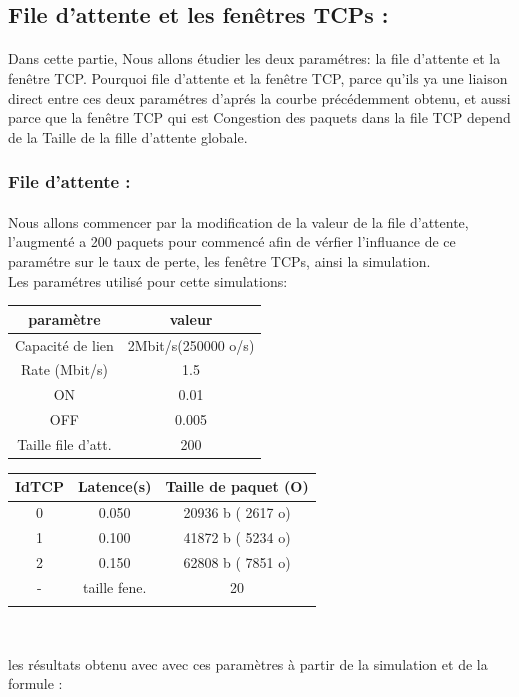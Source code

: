\documentclass[a4paper]{report}
\theoremstyle{definition}
\begin{document}
\newpage
\subsection*{File d'attente et les fenêtres TCPs :}
\paragraph{}
    Dans cette partie, Nous allons étudier les deux paramétres: la file d'attente et la fenêtre TCP.
	Pourquoi file d'attente et la fenêtre TCP, parce qu'ils ya une liaison direct entre ces deux paramétres d'aprés la courbe précédemment obtenu, et aussi parce que la fenêtre TCP qui est Congestion des paquets dans la file TCP depend de la Taille de la fille d'attente globale.
\subsubsection{File d'attente :}
\paragraph*{}
   Nous allons commencer par la modification de la valeur de la file d'attente, l'augmenté a 200 paquets pour commencé afin de vérfier l'influance de ce paramétre sur le taux de perte, les fenêtre TCPs, ainsi la simulation.\\
	Les paramétres utilisé pour cette simulations: \\
	\begin{center}
	

\begin{tabular}{|c|c|}
\hline
 paramètre  & valeur \\ \hline
 
 Capacité de lien & 2Mbit/s(250000 o/s) \\ 
 Rate (Mbit/s) & 1.5 \\ 
 ON & 0.01\\ 
 OFF & 0.005 \\ 
 Taille file d'att. & 200\\
\hline
\end{tabular}
\begin{tabular}{|c|c|c|}
\hline
 IdTCP  & Latence(s) & Taille de paquet (O) \\ \hline
 
 0 & 0.050 & 20936 b ( 2617 o)	 \\ 
 1 & 0.100 & 41872 b ( 5234 o)	 \\ 
 2 & 0.150 & 62808 b ( 7851 o)	 \\ 
 - & taille fene. & 20\\ 
 &&\\
\hline
\end{tabular}\\
	\end{center}
les résultats obtenu avec avec ces paramètres à partir de la simulation et de la formule :  \\
\end{document}
